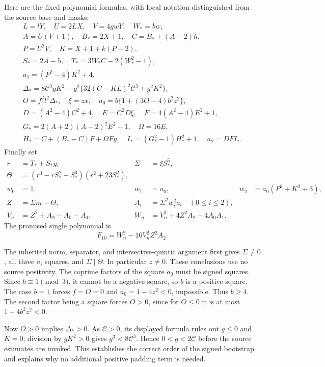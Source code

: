 Here are the fixed polynomial formulas, with local notation distinguished
from the source base and masks:
\begin{gather*}
 L=lY,\quad U=2LX,\quad V=4gwY,\quad W_*=bw,\\
 A=U(V+1),\quad B_*=2X+1,\quad C=B_*+(A-2)h,\\
 P=U^2V,\quad K=X+1+k(P-2),\\
 S_*=2A-5,\quad T_*=3W_*C-2(W_*^2-1),\\
 a_1=(P^2-4)K^2+4,\\
 \Delta_*=8\mathcal C^3gK^2
       -g^2\{32(C-KL)^2\mathcal C^3+g^2K^2\},\\
 O=f^2l^2\Delta_*,\quad \xi=zx,\quad
 a_0=b\{1+(3O-4)b^2z^2\},\\
 D=(A^2-4)C^2+4,\quad E=C^2D\xi,\quad
 F=4(A^2-4)E^2+1,\\
 G_*=2(A+2)(A-2)^2E^2-1,\quad \Omega=16E,\\
 H_*=C+(B_*-C)F+\Omega Fy,\quad
 I_*=(G_*^2-1)H_*^2+1,\quad a_2=DFI_*.
\end{gather*}
Finally set
\begin{align*}
 r&=T_*+S_*y,&\Sigma&=\xi S_*^5,\\
 \Theta&=(r^3-rS_*^2-S_*^3)(r^2+23S_*^2),\\
 w_0&=1,&w_1&=a_0,&w_2&=a_0(P^2+K^2+3),\\
 Z&=\Sigma m-\Theta,&A_i&=\Sigma^2w_i^2a_i\quad(0\le i\le2),\\
 V_n&=Z^2+A_2-A_0-A_1,&
 W_n&=V_n^2+4Z^2A_2-4A_0A_1.
\end{align*}
The promised single polynomial is
\begin{equation}
 \boxed{F_{10}=W_n^2-16V_n^2Z^2A_2.}
 \label{eq:new-shared-sun10}
\end{equation}

The inherited norm, separator, and intersective-quintic argument first
gives $\Sigma\ne0$, all three $a_i$ squares, and $\Sigma\mid\Theta$.
In particular $z\ne0$. These conclusions use no source positivity.
The coprime factors of the square $a_0$ must be signed squares. Since
$b\equiv1\pmod3$, it cannot be a negative square, so $b$ is a positive
square. The case $b=1$ forces $f=O=0$ and $a_0=1-4z^2<0$, impossible.
Thus $b\ge4$. The second factor being a square forces $O>0$, since for
$O\le0$ it is at most $1-4b^2z^2<0$.

Now $O>0$ implies $\Delta_*>0$. As $\mathcal C>0$, its displayed formula
rules out $g\le0$ and $K=0$; division by $gK^2>0$ gives
$g^3<8\mathcal C^3$. Hence $0<g<2\mathcal C$ before the source estimates
are invoked. This establishes the correct order of the signed bootstrap
and explains why no additional positive padding term is needed.

